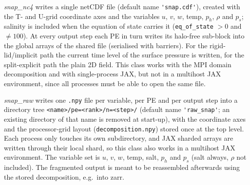 \documentclass[12pt]{article}
\begin{document}
\emph{snap\_nc4} writes a single netCDF file (default name
\verb|'snap.cdf'|), created with the T- and U-grid coordinate axes and the
variables $u$, $v$, $w$, temp, $p_h$, $\rho$ and $p_s$; salinity is included
when the equation of state carries it (\verb|eq_of_state| $>0$ and
$\ne 100$). At every output step each PE in turn writes its halo-free
sub-block into the global arrays of the shared file (serialised with
barriers). For the rigid-lid/implicit path the current time level of the
surface pressure is written, for the split-explicit path the plain 2D field.
This class works with the MPI domain decomposition and with
single-process JAX, but not in a multihost JAX environment, since all
processes must be able to open the same file.

\emph{snap\_raw} writes one \verb|.npy| file per variable, per PE and per
output step into a directory tree
\verb|<name>/pe=<rank>/n=<step>/| (default name \verb|'raw_snap'|; an
existing directory of that name is removed at start-up), with the
coordinate axes and the processor-grid layout
(\verb|decomposition.npy|) stored once at the top level. Each process only
touches its own subdirectory, and JAX sharded arrays are written through
their local shard, so this class also works in a multihost JAX
environment. The variable set is $u$, $v$, $w$, temp, salt, $p_h$ and
$p_s$ (salt always, $\rho$ not included). The fragmented output is meant
to be reassembled afterwards using the stored decomposition, e.g.\ into
zarr.
\end{document}
